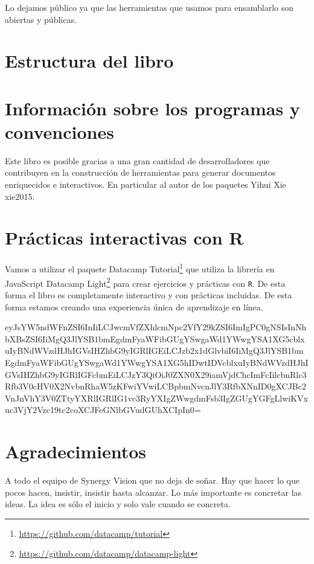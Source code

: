 \documentclass[12pt,]{krantz}
\renewcommand{\href}[2]{#2\footnote{\url{#1}}}
\theoremstyle{definition}
\theoremstyle{definition}
\theoremstyle{definition}
\theoremstyle{remark}
\begin{document}
Lo dejamos público ya que las herramientas que usamos para ensamblarlo
son abiertas y públicas.

\section*{Estructura del libro}\label{estructura-del-libro}


\section*{Información sobre los programas y
convenciones}\label{informacion-sobre-los-programas-y-convenciones}

Este libro es posible gracias a una gran cantidad de desarrolladores que
contribuyen en la construcción de herramientas para generar documentos
enriquecidos e interactivos. En particular al autor de los paquetes
Yihui Xie xie2015.

\section*{Prácticas interactivas con
R}\label{practicas-interactivas-con-r}


Vamos a utilizar el paquete
\href{https://github.com/datacamp/tutorial}{Datacamp Tutorial} que
utiliza la librería en JavaScript
\href{https://github.com/datacamp/datacamp-light}{Datacamp Light} para
crear ejercicios y prácticas con \texttt{R}. De esta forma el libro es
completamente interactivo y con prácticas incluidas. De esta forma
estamos creando una experiencia única de aprendizaje en línea.

eyJsYW5ndWFnZSI6InIiLCJwcmVfZXhlcmNpc2VfY29kZSI6ImIgPC0gNSIsInNhbXBsZSI6IiMgQ3JlYSB1bmEgdmFyaWFibGUgYSwgaWd1YWwgYSA1XG5cblxuIyBNdWVzdHJhIGVsIHZhbG9yIGRlIGEiLCJzb2x1dGlvbiI6IiMgQ3JlYSB1bmEgdmFyaWFibGUgYSwgaWd1YWwgYSA1XG5hIDwtIDVcblxuIyBNdWVzdHJhIGVsIHZhbG9yIGRlIGFcbmEiLCJzY3QiOiJ0ZXN0X29iamVjdChcImFcIilcbnRlc3Rfb3V0cHV0X2NvbnRhaW5zKFwiYVwiLCBpbmNvcnJlY3RfbXNnID0gXCJBc2VnJnVhY3V0ZTtyYXRlIGRlIG1vc3RyYXIgZWwgdmFsb3IgZGUgYGFgLlwiKVxuc3VjY2Vzc19tc2coXCJFeGNlbGVudGUhXCIpIn0=

\section*{Agradecimientos}\label{agradecimientos}


A todo el equipo de Synergy Vision que no deja de soñar. Hay que hacer
lo que pocos hacen, insistir, insistir hasta alcanzar. Lo más importante
es concretar las ideas. La idea es sólo el inicio y solo vale cuando se
concreta.
\end{document}
